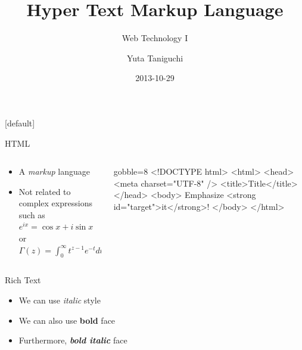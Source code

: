 \documentclass[14pt]{beamer}
\title{Hyper Text Markup Language}
\subtitle{Web Technology I}
\author{Yuta Taniguchi}
\institute{@yuttieyuttie}
\date{2013-10-29}
\begin{document}
{%
  [default]
  \frame{\titlepage}
}
\setcounter{framenumber}{0}


\begin{frame}[fragile]{HTML}
  \begin{columns}
    \begin{column}{0.4\textwidth}
      \begin{itemize}
        \item A \emph{markup} language
        \item Not related to complex expressions such as
          $e^{ix} = \cos x + i \sin x$ or
          $\Gamma(z) = \int_0^\infty t^{z-1} e^{-t} dt$
      \end{itemize}
    \end{column}
    \begin{column}{0.6\textwidth}
      \begin{html*}{gobble=8}
        <!DOCTYPE html>
        <html>
          <head>
            <meta charset="UTF-8" />
            <title>Title</title>
          </head>
          <body>
            Emphasize
            <strong id="target">it</strong>!
          </body>
        </html>
      \end{html*}
    \end{column}
  \end{columns}
\end{frame}


\begin{frame}[fragile]{Rich Text}
  \begin{itemize}
  \item We can use \textit{italic} style
  \item We can also use \textbf{bold} face
  \item Furthermore, \textit{\textbf{bold italic}} face
  \end{itemize}
\end{frame}
\end{document}
